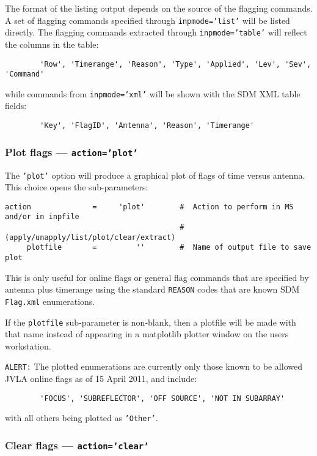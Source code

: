 The format of the listing output depends on the source of the flagging
commands. A set of flagging commands specified through 
{\tt inpmode='list'} will be listed directly. The
flagging commands extracted through {\tt inpmode='table'} will
reflect the columns in the table:
\begin{verbatim}
        'Row', 'Timerange', 'Reason', 'Type', 'Applied', 'Lev', 'Sev', 'Command'
\end{verbatim}
while commands from {\tt inpmode='xml'} will be shown with the SDM
XML table fields:
\begin{verbatim}
        'Key', 'FlagID', 'Antenna', 'Reason', 'Timerange'
\end{verbatim}



\subsubsection{Plot flags --- {\tt action='plot'}}
\label{section:edit.flagcmd.action.plot}

The {\tt 'plot'} option will produce a graphical plot of flags of time versus antenna.
This choice opens the sub-parameters:
\small
\begin{verbatim}
action              =     'plot'        #  Action to perform in MS and/or in inpfile
                                        #   (apply/unapply/list/plot/clear/extract)
     plotfile       =         ''        #  Name of output file to save plot
\end{verbatim}
\normalsize
This is only useful for online flags or general flag commands that are
specified by antenna plus timerange using the standard {\tt REASON}
codes that are known SDM {\tt Flag.xml} enumerations.

If the {\tt plotfile} sub-parameter is non-blank, then a plotfile will
be made with that name instead of appearing in a matplotlib plotter window
on the users workstation.

{\tt ALERT:} The plotted enumerations are currently only those known
to be allowed JVLA online flags as of 15 April 2011, and include:
\begin{verbatim}
        'FOCUS', 'SUBREFLECTOR', 'OFF SOURCE', 'NOT IN SUBARRAY'
\end{verbatim}
with all others being plotted as {\tt 'Other'}.

\subsubsection{Clear flags --- {\tt action='clear'}}
\label{section:edit.flagcmd.action.clear}

